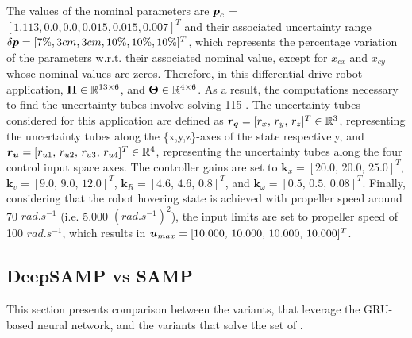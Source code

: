 The values of the nominal parameters are $\boldsymbol{p}_{c}$ = $[1.113, 0.0, 0.0, 0.015, 0.015, 0.007]^T$ and their associated uncertainty range $\delta\boldsymbol{p} = [7\%, 3cm, 3cm, 10\%, 10\%, 10\%]^T$, which represents the percentage variation of the parameters w.r.t. their associated nominal value, except for $x_{cx}$ and $x_{cy}$ whose nominal values are zeros.
Therefore, in this differential drive robot application, $\boldsymbol{\Pi} \in \mathbb{R}^{13\times6}$, and $\boldsymbol{\Theta} \in \mathbb{R}^{4\times6}$.
As a result, the computations necessary to find the uncertainty tubes involve solving 115 .
The uncertainty tubes considered for this application are defined as $\boldsymbol{r_q} = [r_x, \, r_y, \, r_z]^T \in \mathbb{R}^3$, representing the uncertainty tubes along the \{x,y,z\}-axes of the state respectively, and $\boldsymbol{r_u} = [r_{u1}, \, r_{u2}, \, r_{u3}, \, r_{u4}]^T \in \mathbb{R}^4$, representing the uncertainty tubes along the four control input space axes.
The controller gains are set to $\boldsymbol{k}_{x} = [20.0, \, 20.0, \, 25.0]^T$, $\boldsymbol{k}_{v}= [9.0, \, 9.0, \, 12.0]^T$, $\boldsymbol{k}_{R}=[4.6, \, 4.6, \, 0.8]^T$, and $\boldsymbol{k}_{\omega}=[0.5, \, 0.5, \, 0.08]^T$.
Finally, considering that the robot hovering state is achieved with propeller speed around 70 $rad.s^{-1}$ (i.e. 5.000 $(rad.s^{-1})^2$), the input limits are set to propeller speed of 100 $rad.s^{-1}$, which results in $\boldsymbol{u}_{max} = [10.000, \, 10.000, \, 10.000, \, 10.000]^T$.

\subsection{DeepSAMP vs SAMP} \label{sec:NNresult}

This section presents comparison between the  variants, that leverage the GRU-based neural network, and the  variants that solve the set of .

